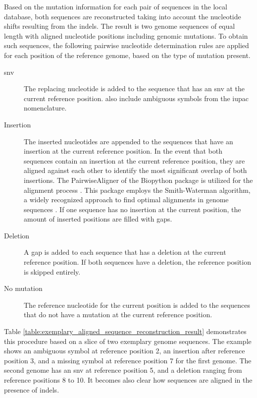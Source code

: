 Based on the mutation information for each pair of sequences in the local database, both sequences are reconstructed taking into account the nucleotide shifts resulting from the indels. The result is two genome sequences of equal length with aligned nucleotide positions including genomic mutations. To obtain such sequences, the following pairwise nucleotide determination rules are applied for each position of the reference genome, based on the type of mutation present.
\begin{description}
  \item[\acrshort{snv}] The replacing nucleotide is added to the sequence that has an \acrshort{snv} at the current reference position.  also include ambiguous symbols from the \acrshort{iupac} nomenclature.
  \item[Insertion] The inserted nucleotides are appended to the sequences that have an insertion at the current reference position. In the event that both sequences contain an insertion at the current reference position, they are aligned against each other to identify the most significant overlap of both insertions. The PairwiseAligner of the Biopython package is utilized for the alignment process \cite{Bio1}. This package employs the Smith-Waterman algorithm, a widely recognized approach to find optimal alignments in genome sequences \cite{Bio2}. If one sequence has no insertion at the current position, the amount of inserted positions are filled with gaps.
  \item[Deletion] A gap is added to each sequence that has a deletion at the current reference position. If both sequences have a deletion, the reference position is skipped entirely.
  \item[No mutation] The reference nucleotide for the current position is added to the sequences that do not have a mutation at the current reference position.
\end{description}

Table \ref{table:exemplary_aligned_sequence_reconstruction_result} demonstrates this procedure based on a slice of two exemplary genome sequences. The example shows an ambiguous symbol at reference position 2, an insertion after reference position 3, and a missing symbol at reference position 7 for the first genome. The second genome has an \acrshort{snv} at reference position 5, and a deletion ranging from reference positions 8 to 10. It becomes also clear how sequences are aligned in the presence of indels.

